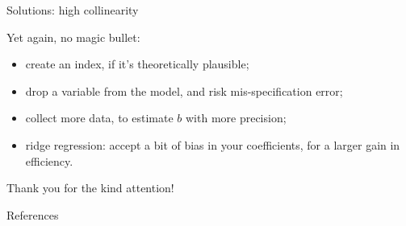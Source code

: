 \documentclass[12pt,english,pdf,xcolor=dvipsnames,aspectratio=169,handout]{beamer}\usepackage[]{graphicx}\usepackage[]{xcolor}
\begin{document}
\begin{frame}{Solutions: high collinearity}

Yet again, no magic bullet:

\begin{itemize}
\item create an index, if it's theoretically plausible;
\item drop a variable from the model, and risk mis-specification error;
\item collect more data, to estimate $b$ with more precision;
\item ridge regression: accept a bit of bias in your coefficients, for a larger gain in efficiency.
\end{itemize}

\end{frame}



\begin{frame}
\begin{center}
    \Huge Thank \textcolor{title}{you} for the kind attention!
\end{center}
\end{frame}


\begin{frame}[allowframebreaks]{References}


\end{frame}
\end{document}
